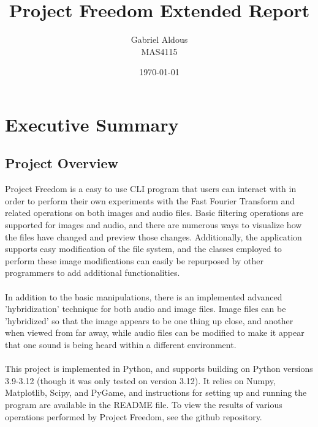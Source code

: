 \documentclass[notitlepage]{article}
\begin{document}

\title{Project Freedom Extended Report}
\author{Gabriel Aldous\\MAS4115}
\date{\isodate\today}

\maketitle

\tableofcontents

\newpage
\section{Executive Summary}

\subsection{Project Overview}

Project Freedom is a easy to use CLI program that
users can interact with in order to perform their own experiments
with the Fast Fourier Transform and related operations on both images and audio files.
Basic filtering operations are supported for images and audio, and
there are numerous ways to visualize how the files have changed
and preview those changes. Additionally, the application supports
easy modification of the file system, and the classes employed
to perform these image modifications can easily be repurposed by
other programmers to add additional functionalities.
\\\\
In addition to the basic manipulations, there is an implemented
advanced 'hybridization' technique for both audio and image files.
Image files can be 'hybridized' so that the image appears to be one
thing up close, and another when viewed from far away, while audio
files can be modified to make it appear that one sound is being heard
within a different environment.
\\\\
This project is implemented in Python, and supports building on
Python versions 3.9-3.12 (though it was only tested on version 3.12).
It relies on Numpy, Matplotlib, Scipy, and PyGame, and instructions for
setting up and running the program are available in the README file.
To view the results of various operations performed by Project Freedom,
see the github repository.
\\\\
\end{document}
